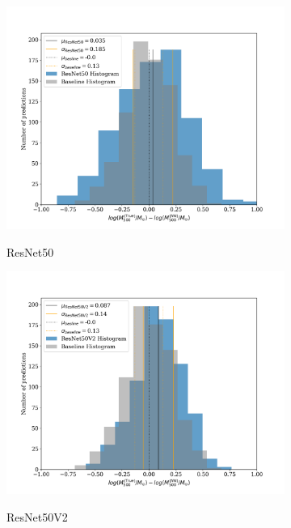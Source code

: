 \begin{figure}[H]
\begin{subfigure}{.325\textwidth}
    \centering
    \includegraphics[width=\linewidth]{images/Chapter4/Results/test_ResNet50_hist.png}
    \label{fig:test_ResNet50_hist}
    \caption{ResNet50}
\end{subfigure}
\begin{subfigure}{.325\textwidth}
    \centering
    \includegraphics[width=\linewidth]{images/Chapter4/Results/test_ResNet50V2_hist.png}
    \label{fig:test_ResNet50V2_hist}
    \caption{ResNet50V2}
\end{subfigure}
\begin{subfigure}{.325\textwidth}

\end{subfigure}
\end{figure}
